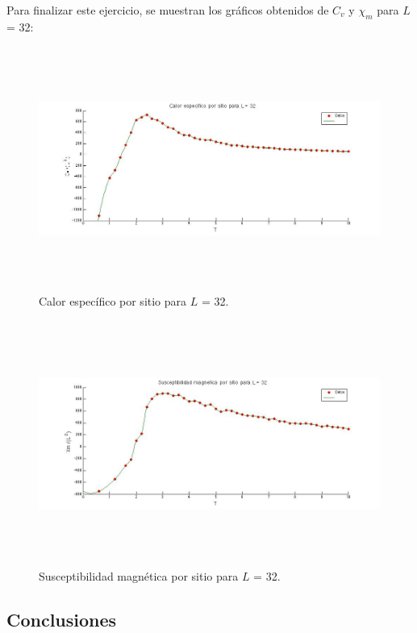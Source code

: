 \documentclass[a4paper,12pt]{article}
\begin{document}
Para finalizar este ejercicio, se muestran los gr\'aficos obtenidos de $C_{v}$ y $\chi_{m}$ para $L$ = 32:

\begin{figure}[H]
\begin{center}
\includegraphics[height=8cm,width=20cm]{../graficos/Cv_L32.jpg}
\caption[width=5cm]{Calor espec\'ifico por sitio para $L$ = 32.}
\end{center}
\end{figure}

\begin{figure}[H]
\begin{center}
\includegraphics[height=8cm,width=20cm]{../graficos/Xm_L32.jpg}
\caption[width=5cm]{Susceptibilidad magn\'etica por sitio para $L$ = 32.}
\end{center}
\end{figure}

\subsection{Conclusiones}
\end{document}
